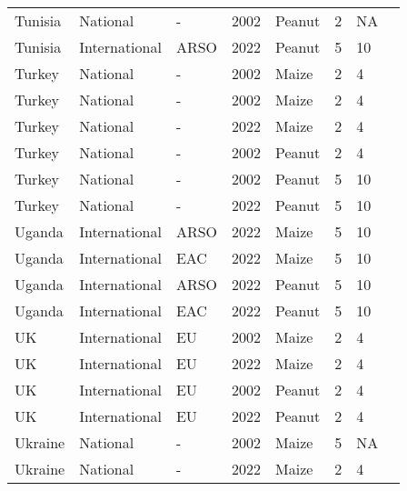 \begin{landscape}
\begin{longtable}[c]{llllllll}
Tunisia           & National      & -        & 2002 & Peanut & 2  & NA & \citet{van2004worldwide}     \\
Tunisia           & International & ARSO     & 2022 & Peanut & 5  & 10 & \citet{ARSO2022}             \\
Turkey            & National      & -        & 2002 & Maize  & 2  & 4  & \citet{van2004worldwide}     \\
Turkey            & National      & -        & 2002 & Maize  & 2  & 4  & \citet{van2004worldwide}     \\
Turkey            & National      & -        & 2022 & Maize  & 2  & 4  & \citet{GKGM2011}             \\
Turkey            & National      & -        & 2002 & Peanut & 2  & 4  & \citet{van2004worldwide}     \\
Turkey            & National      & -        & 2002 & Peanut & 5  & 10 & \citet{van2004worldwide}     \\
Turkey            & National      & -        & 2022 & Peanut & 5  & 10 & \citet{GKGM2011}             \\
Uganda            & International & ARSO     & 2022 & Maize  & 5  & 10 & \citet{ARSO2022}             \\
Uganda            & International & EAC      & 2022 & Maize  & 5  & 10 & \citet{EAC2018}              \\
Uganda            & International & ARSO     & 2022 & Peanut & 5  & 10 & \citet{ARSO2022}             \\
Uganda            & International & EAC      & 2022 & Peanut & 5  & 10 & \citet{EAC2018}              \\
UK                & International & EU       & 2002 & Maize  & 2  & 4  & \citet{EC2010}               \\
UK                & International & EU       & 2022 & Maize  & 2  & 4  & \citet{EC2010}               \\
UK                & International & EU       & 2002 & Peanut & 2  & 4  & \citet{EC2010}               \\
UK                & International & EU       & 2022 & Peanut & 2  & 4  & \citet{EC2010}               \\
Ukraine           & National      & -        & 2002 & Maize  & 5  & NA & \citet{van2004worldwide}     \\
Ukraine           & National      & -        & 2022 & Maize  & 2  & 4  & \citet{MOZ2013}              \\

\end{longtable}
\end{landscape}
